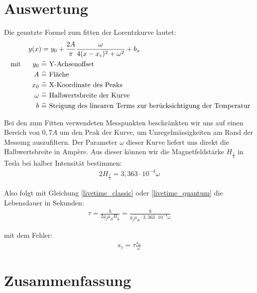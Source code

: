 \documentclass[12pt]{article}
\begin{document}
\section{Auswertung}
Die genutzte Formel zum fitten der Lorentzkurve lautet:
\begin{align}
 y(x) &= y_0+\frac{2A}{\pi}\frac{\omega}{4(x-x_c)^2+\omega^2}+b_x \\
\notag \textnormal{ mit }~~~~ y_0~&\widehat{=} \textnormal{ Y-Achsenoffset } \\
\notag A~ &\widehat{=} \textnormal{ Fläche } \\
\notag x_0~ &\widehat{=} \textnormal{ X-Koordinate des Peaks } \\
\notag \omega~ &\widehat{=} \textnormal{ Halbwertsbreite der Kurve } \\
\notag b~ &\widehat{=} \textnormal{ Steigung des linearen Terms zur berücksichtigung der Temperatur}
\end{align}

Bei den zum Fitten verwendeten Messpunkten beschränkten wir uns auf einen Bereich von $0,7A$ um den Peak der Kurve, um
Unregelmässigkeiten am Rand der Messung auszufiltern. Der Parameter $\omega$ dieser Kurve liefert uns direkt die
Halbwertsbreite in Ampère. Aus dieser können wir die Magnetfeldstärke $H_{\frac{1}{2}}$ in Tesla bei halber Intensität bestimmen:
\begin{align}
 2H_{\frac{1}{2}}= 3,363\cdot 10^{-4} \omega
\end{align}

Also folgt mit Gleichung \ref{livetime_classic} oder \ref{livetime_quantum} die Lebensdauer in Sekunden:
\begin{align}
 \tau = \frac{\hbar}{2g_j \mu_B H_{\frac{1}{2}}} = \frac{\hbar}{g_j \mu_B\cdot 3,363\cdot 10^{-4} \omega}
\end{align}

mit dem Fehler:
\begin{align}
 s_{\tau}=\tau \frac{s_{\omega}}{\omega}
\end{align}







\section{Zusammenfassung}
\singlespacing

\end{document}

